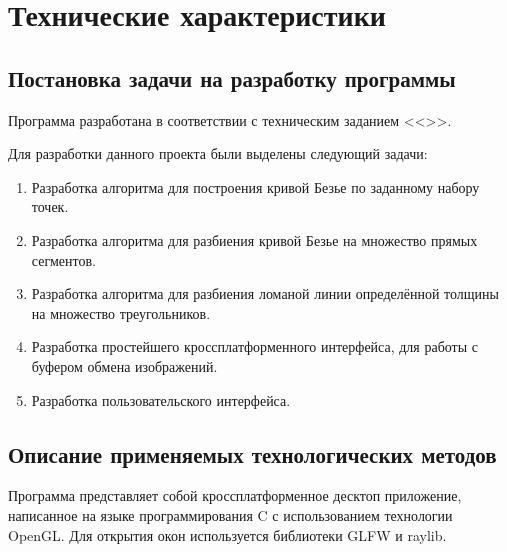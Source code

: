\documentclass[a4paper,12pt]{article}
\begin{document}
  \newpage
  \section{Технические характеристики}
  \subsection{Постановка задачи на разработку программы}
  Программа разработана в соответствии с техническим заданием <<\CRTname>>.

  Для разработки данного проекта были выделены следующий задачи:
  \begin{enumerate}
    \item Разработка алгоритма для построения кривой Безье по заданному набору точек.
    \item Разработка алгоритма для разбиения кривой Безье на множество прямых сегментов.
    \item Разработка алгоритма для разбиения ломаной линии определённой толщины на множество треугольников.
    \item Разработка простейшего кроссплатформенного интерфейса, для работы с буфером обмена изображений.
    \item Разработка пользовательского интерфейса.
  \end{enumerate}

  \subsection{Описание применяемых технологических методов}
  Программа представляет собой кроссплатформенное десктоп приложение,
  написанное на языке программирования C с использованием технологии OpenGL\cite{opengl}.
  Для открытия окон используется библиотеки GLFW\cite{glfw} и raylib\cite{raylib}.
\end{document}
